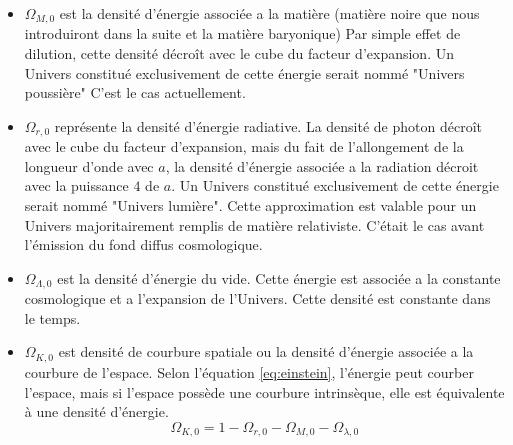 \begin{itemize}

\item $\Omega_{M,0}$ est la densité d'énergie associée a la matière (matière noire que nous introduiront dans la suite et la matière baryonique)
Par simple effet de dilution, cette densité décroît avec le cube du facteur d'expansion.
Un Univers constitué exclusivement de cette énergie serait nommé "Univers poussière"
C'est le cas actuellement.

\item $\Omega_{r,0}$ représente la densité d'énergie radiative.
La densité de photon décroît avec le cube du facteur d'expansion, mais du fait de l'allongement de la longueur d'onde avec $a$, la densité d'énergie associée a la radiation décroit avec la puissance $4$ de $a$.
Un Univers constitué exclusivement de cette énergie serait nommé "Univers lumière".
Cette approximation est valable pour un Univers majoritairement remplis de matière relativiste.
C'était le cas avant l’émission du fond diffus cosmologique.


\item $\Omega_{\Lambda,0}$ est la densité d’énergie du vide.
Cette énergie est associée a la constante cosmologique et a l'expansion de l'Univers. 
Cette densité est constante dans le temps.

\item $\Omega_{K,0}$ est densité de courbure spatiale ou la densité d'énergie associée a la courbure de l'espace.
Selon l’équation \ref{eq:einstein}, l'énergie peut courber l'espace, mais si l'espace possède une courbure intrinsèque, elle est équivalente à une densité d'énergie.
\begin{equation}
\Omega_{K,0} = 1 - \Omega_{r,0} - \Omega_{M,0} - \Omega_{\lambda,0} 
\end{equation}

\end{itemize}





